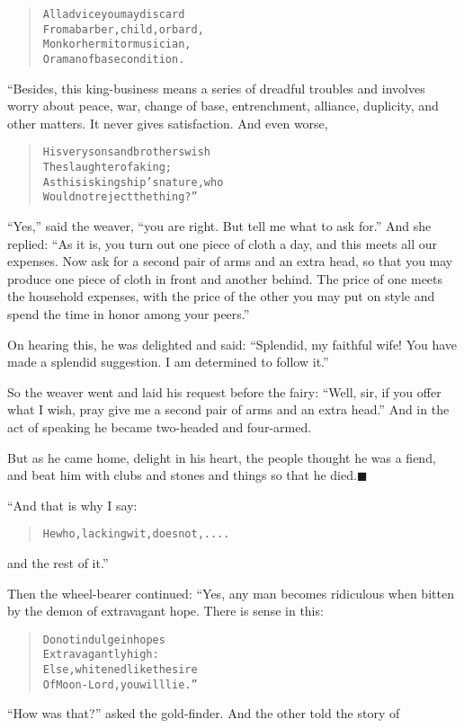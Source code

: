 \documentclass[article, twoside, 14pt]{memoir}
\newcommand{\qed}{\hfill \ensuremath{\blacksquare}}
\renewenvironment{verbatim}{%
\begin{quote}%
\vskip -10pt%
\begin{alltt}\normalfont\large}{\end{alltt}%
\end{quote}%
\vskip -10pt
} %
\begin{document}
\begin{verbatim}
All advice you may discard
From a barber, child, or bard,
Monk or hermit or musician,
Or a man of base condition.
\end{verbatim}
“Besides, this king-business means a series of dreadful
troubles and involves worry about peace, war, change of base,
entrenchment, alliance, duplicity, and other matters. It never
gives satisfaction. And even worse,

\begin{verbatim}
His very sons and brothers wish
    The slaughter of a king;
As this is kingship's nature, who
    Would not reject the thing?”
\end{verbatim}
``Yes,'' said the weaver,
``you are right. But tell me what to ask for.'' And she replied:
``As it is, you turn out one piece of cloth a day, and this meets all our expenses. Now ask for a second pair of arms and an extra head, so that you may produce one piece of cloth in front and another behind. The price of one meets the household expenses, with the price of the other you may put on style and spend the time in honor among your peers.''

On hearing this, he was delighted and said:
``Splendid, my faithful wife! You have made a splendid suggestion. I am determined to follow it.''

So the weaver went and laid his request before the fairy:
``Well, sir, if you offer what I wish, pray give me a second pair of arms and an extra head.''
And in the act of speaking he became two-headed and four-armed.

But as he came home, delight in his heart, the people thought he
was a fiend, and beat him with clubs and stones and things so that
he died.\hyperref[s85]{\qed}

“And that is why I say:

\begin{verbatim}
He who, lacking wit, does not,....
\end{verbatim}
and the rest of it.”

Then the wheel-bearer continued: “Yes, any man becomes ridiculous
when bitten by the demon of extravagant hope. There is sense in
this:

\begin{verbatim}
Do not indulge in hopes
    Extravagantly high:
Else, whitened like the sire
    Of Moon-Lord, you will lie.”
\end{verbatim}
``How was that?'' asked the gold-finder. And the other told the
story of
\end{document}

